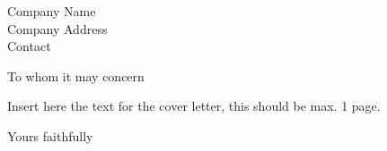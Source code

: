 \documentclass[
parskip=half,
fontsize=11pt, %
twoside=off, %
version=last,
foldmarks=false,
fromalign=center, %
fromrule=true,
frommobilephone,
fromemail,
fromlogo, %
subject=titled,
backaddress=false,
draft=true, %
firstfoot=false, %
final=false, %
]    
{scrlttr2}
\newcommand{\address}{
Company Name    \\
Company Address \\
Contact         \\
}
\begin{document}
\begin{letter}{\address}
	\opening{To whom it may concern}

	Insert here the text for the cover letter, this should be max. 1 page.
	\closing{Yours faithfully}


\end{letter}
\end{document}

